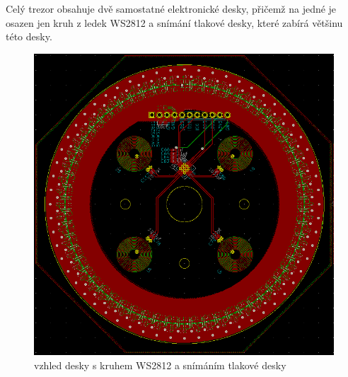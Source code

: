 \newpage

Celý trezor obsahuje dvě samostatné elektronické desky, přičemž na jedné je osazen jen kruh z ledek WS2812 a snímání tlakové desky, které zabírá 
většinu této desky.

\begin{figure}[htbp]
    \centering
    \includegraphics[width=\textwidth]{kapitoly/obrazky/E4/elektronika_tlakove_desky/leddeska-KiCad.png}
    \caption{vzhled desky s kruhem WS2812 a snímáním tlakové desky}
    \label{fig:E4-LedDeska}
\end{figure}

\newpage